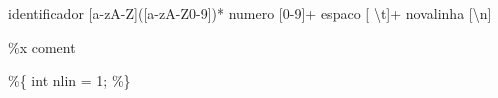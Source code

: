 \documentclass[
  brazilian,
  letterpaper,
]{book}
\newenvironment{Shaded}{\begin{snugshade}}{\end{snugshade}}
\newcommand{\DataTypeTok}[1]{\textcolor[rgb]{0.68,0.00,0.00}{#1}}
\newcommand{\DecValTok}[1]{\textcolor[rgb]{0.68,0.00,0.00}{#1}}
\newcommand{\NormalTok}[1]{\textcolor[rgb]{0.00,0.23,0.31}{#1}}
\newcommand{\OperatorTok}[1]{\textcolor[rgb]{0.37,0.37,0.37}{#1}}
\theoremstyle{plain}
\theoremstyle{definition}
\theoremstyle{remark}
\begin{document}
\begin{Shaded}
\begin{Highlighting}[]
\NormalTok{identificador }\OperatorTok{[}\NormalTok{a}\OperatorTok{{-}}\NormalTok{zA}\OperatorTok{{-}}\NormalTok{Z}\OperatorTok{]([}\NormalTok{a}\OperatorTok{{-}}\NormalTok{zA}\OperatorTok{{-}}\NormalTok{Z0}\OperatorTok{{-}}\DecValTok{9}\OperatorTok{])*}
\NormalTok{numero }\OperatorTok{[}\DecValTok{0}\OperatorTok{{-}}\DecValTok{9}\OperatorTok{]+}
\NormalTok{espaco }\OperatorTok{[}\NormalTok{ \textbackslash{}t}\OperatorTok{]+}
\NormalTok{novalinha }\OperatorTok{[}\NormalTok{\textbackslash{}n}\OperatorTok{]}

\OperatorTok{\%}\NormalTok{x coment}

\OperatorTok{\%\{}
    \DataTypeTok{int}\NormalTok{ nlin }\OperatorTok{=} \DecValTok{1}\OperatorTok{;}
\OperatorTok{\%\}}


\end{Highlighting}
\end{Shaded}
\end{document}
